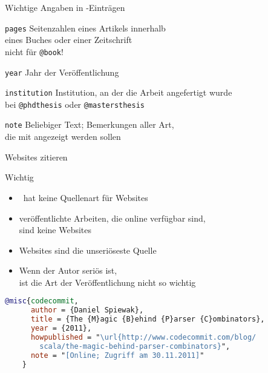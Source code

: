 \begin{Frame}{Wichtige Angaben in \BibTeX-Einträgen}
  \framebreak

  \begin{Block}{\lstinline-pages-}
    Seitenzahlen eines Artikels innerhalb\\
    eines Buches oder einer Zeitschrift\\
    \alert{nicht für \lstinline-@book-!}
  \end{Block}

  \begin{Block}{\lstinline-year-}
    Jahr der Veröffentlichung
  \end{Block}

  \begin{Block}{\lstinline-institution-}
    Institution, an der die Arbeit angefertigt wurde\\
    bei \lstinline-@phdthesis- oder \lstinline-@mastersthesis-
  \end{Block}

  \begin{Block}{\lstinline-note-}
    Beliebiger Text; Bemerkungen aller Art,\\
    die mit angezeigt werden sollen
  \end{Block}
\end{Frame}

\begin{Frame}[fragile]{Websites zitieren}
  \begin{alertblock}{Wichtig}
    \begin{itemize}
      \item \BibTeX\ hat \alert{keine Quellenart} für Websites
      \item veröffentlichte Arbeiten, die online verfügbar sind,\\
        sind \alert{keine Websites}
      \item Websites sind die \alert{unseriöseste Quelle}
      \item Wenn der \alert{Autor seriös} ist,\\
        ist die Art der Veröffentlichung nicht so wichtig
    \end{itemize}
  \end{alertblock}

  \xxx

  \begin{lstlisting}[language=BibTeX,gobble=4]
    @misc{codecommit,
      author = {Daniel Spiewak},
      title = {The {M}agic {B}ehind {P}arser {C}ombinators},
      year = {2011},
      howpublished = "\url{http://www.codecommit.com/blog/
      	scala/the-magic-behind-parser-combinators}",
      note = "[Online; Zugriff am 30.11.2011]"
    }
  \end{lstlisting}
\end{Frame}

